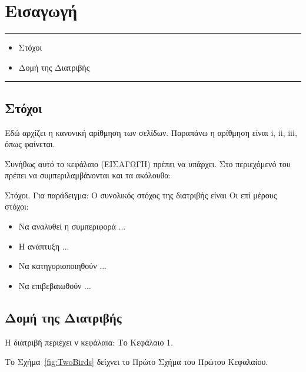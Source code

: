 \chapter{Εισαγωγή}
\label{ch:intro}
\hrule\vspace{0.2in}
\begin{itemize}
  \item[\ref{sec:11}] Στόχοι
  \item[\ref{sec:12}] Δομή της Διατριβής
\end{itemize}
\hrule \vspace{0.2in}



\section{Στόχοι}\label{sec:11}
Εδώ αρχίζει η κανονική αρίθμηση των σελίδων. Παραπάνω η αρίθμηση
είναι i, ii, iii, όπως φαίνεται.

Συνήθως αυτό το κεφάλαιο (ΕΙΣΑΓΩΓΗ) πρέπει να υπάρχει. Στο
περιεχόμενό του πρέπει να συμπεριλαμβάνονται και τα ακόλουθα:

\y Στόχοι. Για παράδειγμα: Ο συνολικός στόχος της διατριβής είναι
Οι επί μέρους στόχοι:
\begin{itemize}
\item Να αναλυθεί η συμπεριφορά ...
\item Η ανάπτυξη  ...
\item Να κατηγοριοποιηθούν  ...
\item Να επιβεβαιωθούν  ...
\end{itemize}




\section{Δομή της Διατριβής}\label{sec:12}
Η διατριβή περιέχει ν κεφάλαια: Το Κεφάλαιο 1.


\newpage
Το Σχήμα~\ref{fig:TwoBirds} δείχνει το Πρώτο Σχήμα του Πρώτου Κεφαλαίου.

